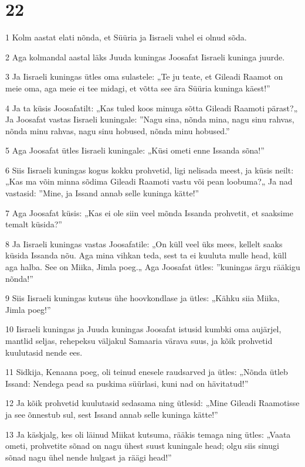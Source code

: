 \chapter{22}

\par 1 Kolm aastat elati nõnda, et Süüria ja Iisraeli vahel ei olnud sõda.
\par 2 Aga kolmandal aastal läks Juuda kuningas Joosafat Iisraeli kuninga juurde.
\par 3 Ja Iisraeli kuningas ütles oma sulastele: „Te ju teate, et Gileadi Raamot on meie oma, aga meie ei tee midagi, et võtta see ära Süüria kuninga käest!”
\par 4 Ja ta küsis Joosafatilt: „Kas tuled koos minuga sõtta Gileadi Raamoti pärast?„ Ja Joosafat vastas Iisraeli kuningale: ”Nagu sina, nõnda mina, nagu sinu rahvas, nõnda minu rahvas, nagu sinu hobused, nõnda minu hobused.”
\par 5 Aga Joosafat ütles Iisraeli kuningale: „Küsi ometi enne Issanda sõna!”
\par 6 Siis Iisraeli kuningas kogus kokku prohvetid, ligi nelisada meest, ja küsis neilt: „Kas ma võin minna sõdima Gileadi Raamoti vastu või pean loobuma?„ Ja nad vastasid: ”Mine, ja Issand annab selle kuninga kätte!”
\par 7 Aga Joosafat küsis: „Kas ei ole siin veel mõnda Issanda prohvetit, et saaksime temalt küsida?”
\par 8 Ja Iisraeli kuningas vastas Joosafatile: „On küll veel üks mees, kellelt saaks küsida Issanda nõu. Aga mina vihkan teda, sest ta ei kuuluta mulle head, küll aga halba. See on Miika, Jimla poeg.„ Aga Joosafat ütles: ”kuningas ärgu rääkigu nõnda!”
\par 9 Siis Iisraeli kuningas kutsus ühe hoovkondlase ja ütles: „Kähku siia Miika, Jimla poeg!”
\par 10 Iisraeli kuningas ja Juuda kuningas Joosafat istusid kumbki oma aujärjel, mantlid seljas, rehepeksu väljakul Samaaria värava suus, ja kõik prohvetid kuulutasid nende ees.
\par 11 Sidkija, Kenaana poeg, oli teinud enesele raudsarved ja ütles: „Nõnda ütleb Issand: Nendega pead sa puskima süürlasi, kuni nad on hävitatud!”
\par 12 Ja kõik prohvetid kuulutasid sedasama ning ütlesid: „Mine Gileadi Raamotisse ja see õnnestub sul, sest Issand annab selle kuninga kätte!”
\par 13 Ja käskjalg, kes oli läinud Miikat kutsuma, rääkis temaga ning ütles: „Vaata ometi, prohvetite sõnad on nagu ühest suust kuningale head; olgu siis sinugi sõnad nagu ühel nende hulgast ja räägi head!”
